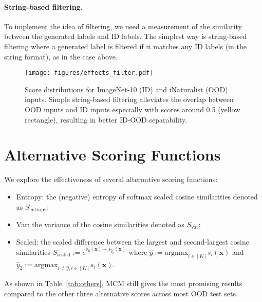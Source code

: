 \documentclass{article}
\def\*#1{\mathbf{#1}}
\begin{document}
\paragraph{String-based filtering.} To implement the idea of filtering, we need a measurement of the similarity between the generated labels and ID labels. The simplest way is string-based filtering where a generated label is filtered if it matches any ID labels (in the string format), as in the case above. 


\begin{figure*}[h]
\centering
\texttt{[image: figures/effects\_filter.pdf]}
\caption{Score distributions for ImageNet-10 (ID) and iNaturalist (OOD) inputs.  Simple string-based filtering alleviates the overlap between OOD inputs and ID inputs especially with scores around 0.5 (yellow rectangle), resulting in better ID-OOD separability.}
\label{fig:effects}
\end{figure*}









\section{Alternative Scoring Functions}
 
We explore the effectiveness of several alternative scoring functions:
\begin{itemize}
    \item Entropy: the (negative) entropy of softmax scaled cosine similarities denoted as $ S_{\text{entropy}}$;
    \item Var: the variance of the cosine similarities denoted as $ S_{\text{var}}$;
    \item Scaled: the scaled difference between the largest and second-largest cosine similarities $ S_{\text{scaled}}:= e^{s_{\hat y}(\*x) - s_{\hat y_2}(\*x)} $ where $\hat y:= \text{argmax}_{i\in[K]} s_i(\*x)$ and $\hat y_2:= \text{argmax}_{i\neq \hat y, i\in[K]} s_i(\*x)$.
\end{itemize}

As shown in Table~\ref{tab:others},  MCM still gives the most promising results compared to the other three alternative scores across most OOD test sets. 
\end{document}
